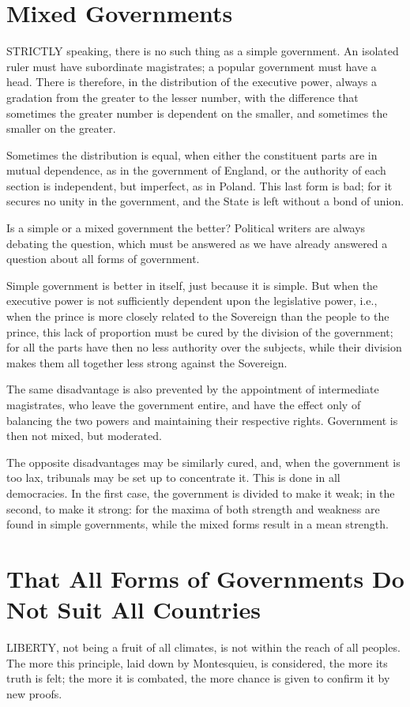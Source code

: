 \documentclass[12pt]{book}
\begin{document}
\section{Mixed Governments}
STRICTLY speaking, there is no such thing as a simple government. An isolated ruler must have subordinate magistrates; a popular government must have a head. There is therefore, in the distribution of the executive power, always a gradation from the greater to the lesser number, with the difference that sometimes the greater number is dependent on the smaller, and sometimes the smaller on the greater.

Sometimes the distribution is equal, when either the constituent parts are in mutual dependence, as in the government of England, or the authority of each section is independent, but imperfect, as in Poland. This last form is bad; for it secures no unity in the government, and the State is left without a bond of union.

Is a simple or a mixed government the better? Political writers are always debating the question, which must be answered as we have already answered a question about all forms of government.

Simple government is better in itself, just because it is simple. But when the executive power is not sufficiently dependent upon the legislative power, i.e., when the prince is more closely related to the Sovereign than the people to the prince, this lack of proportion must be cured by the division of the government; for all the parts have then no less authority over the subjects, while their division makes them all together less strong against the Sovereign.

The same disadvantage is also prevented by the appointment of intermediate magistrates, who leave the government entire, and have the effect only of balancing the two powers and maintaining their respective rights. Government is then not mixed, but moderated.

The opposite disadvantages may be similarly cured, and, when the government is too lax, tribunals may be set up to concentrate it. This is done in all democracies. In the first case, the government is divided to make it weak; in the second, to make it strong: for the maxima of both strength and weakness are found in simple governments, while the mixed forms result in a mean strength.

\section{That All Forms of Governments Do Not Suit All Countries}
LIBERTY, not being a fruit of all climates, is not within the reach of all peoples. The more this principle, laid down by Montesquieu, is considered, the more its truth is felt; the more it is combated, the more chance is given to confirm it by new proofs.
\end{document}
